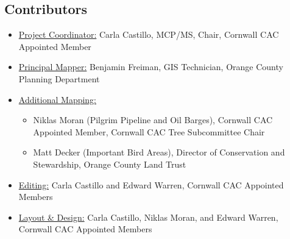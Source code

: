 \subsection*{Contributors}\label{subsec:contributors}
\begin{itemize}
    \item \underline{Project Coordinator:} Carla Castillo, MCP/MS, Chair, 
Cornwall CAC Appointed Member
    \item \underline{Principal Mapper:} Benjamin Freiman, GIS Technician, 
Orange County Planning Department
    \item \underline{Additional Mapping:}
    \begin{itemize}
        \item Niklas Moran (Pilgrim Pipeline and Oil Barges), Cornwall CAC 
Appointed Member, Cornwall CAC Tree Subcommittee Chair
        \item Matt Decker (Important Bird Areas), Director of Conservation and 
Stewardship, Orange County Land Trust
    \end{itemize}
    \item \underline{Editing:} Carla Castillo and Edward Warren, Cornwall CAC 
Appointed Members
    \item \underline{Layout \& Design:} Carla Castillo, Niklas Moran, and Edward 
Warren, Cornwall CAC Appointed Members
\end{itemize}
\pagebreak

